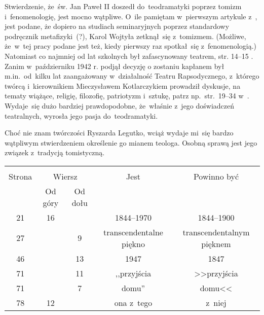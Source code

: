 \documentclass[a4paper,11pt]{article}
\begin{document}

\start {} Stwierdzenie, że~św. Jan Paweł II doszedł
do~teodramatyki poprzez tomizm i~fenomenologię, jest mocno wątpliwe.
O~ile pamiętam w~pierwszym artykule z~\cite{PM11}, jest podane, że
dopiero na studiach seminaryjnych poprzez standardowy podręcznik
metafizyki~(?), Karol Wojtyła zetknął~się z~tomizmem. (Możliwe,
że~w~tej pracy podane jest też, kiedy pierwszy raz spotkał~się
z~fenomenologią.) Natomiast co najmniej od lat szkolnych był
zafascynowany teatrem, str. 14--15 \cite{Now15a}. Zanim w~październiku
1942 r. podjął decyzję o zostaniu kapłanem był m.in.~od~kilku lat
zaangażowany w~działalność Teatru Rapsodycznego, z~którego twórcą
i~kierownikiem Mieczysławem Kotlarczykiem prowadził dyskusje, na
tematy wiążące, religię, filozofię, patriotyzm i~sztukę, patrz
np.~str.~19--34 w~\cite{Nowa15a}. Wydaje~się dużo bardziej
prawdopodobne, że~właśnie z~jego doświadczeń teatralnych, wyrosła jego
pasja do~teodramatyki.

\vspace{\spaceFour}


\start {} Choć nie znam twórczości Ryszarda Legutko, wciąż
wydaje mi~się bardzo wątpliwym stwierdzeniem określenie go mianem
teologa. Osobną sprawą jest jego związek z~tradycją tomistyczną.

\begin{center}
  \begin{tabular}{|c|c|c|c|c|}
    \hline
    & \multicolumn{2}{c|}{} & & \\
    Strona & \multicolumn{2}{c|}{Wiersz} & Jest
                              & Powinno być \\ \cline{2-3}
    & Od góry & Od dołu & & \\
    \hline
    21  & 16 & & 1844--1970 & 1844--1900 \\
    27  & &  9 & transcendentalne piękno & transcendentalnym pięknem \\
    46  & & 13 & 1947 & 1847 \\
    71  & & 11 & ,,przyjścia  %
           & >>przyjścia \\
    71  & &  7 & domu'' & domu<< \\
    78  & 12 & & ona z~tego & z~niej \\
    \hline
  \end{tabular}
\end{center}

\vspace{\spaceTwo}
\end{document}
